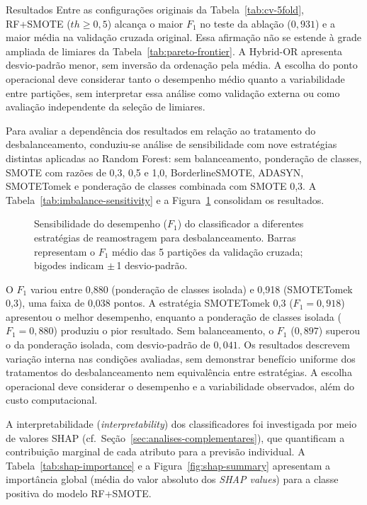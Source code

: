 \begin{chapter}{Resultados}
Entre as configurações originais da Tabela~\ref{tab:cv-5fold}, RF+SMOTE ($th \geq 0{,}5$) alcança o maior $F_1$ no teste da ablação ($0{,}931$) e a maior média na validação cruzada original. Essa afirmação não se estende à grade ampliada de limiares da Tabela~\ref{tab:pareto-frontier}. A Hybrid-OR apresenta desvio-padrão menor, sem inversão da ordenação pela média. A escolha do ponto operacional deve considerar tanto o desempenho médio quanto a variabilidade entre partições, sem interpretar essa análise como validação externa ou como avaliação independente da seleção de limiares.

Para avaliar a dependência dos resultados em relação ao tratamento do desbalanceamento, conduziu-se análise de sensibilidade com nove estratégias distintas aplicadas ao Random Forest: sem balanceamento, ponderação de classes, SMOTE com razões de 0,3, 0,5 e 1,0, BorderlineSMOTE, ADASYN, SMOTETomek e ponderação de classes combinada com SMOTE 0,3. A Tabela~\ref{tab:imbalance-sensitivity} e a Figura~\ref{fig:imbalance-sensitivity} consolidam os resultados.



\begin{figure}[!ht]
\centering
\resizebox{0.92\textwidth}{!}{}
\caption{Sensibilidade do desempenho ($F_1$) do classificador a diferentes estratégias de reamostragem para desbalanceamento. Barras representam o $F_1$ médio das 5 partições da validação cruzada; bigodes indicam $\pm$\,1 desvio-padrão.}
\label{fig:imbalance-sensitivity}
\end{figure}

O $F_1$ variou entre 0,880 (ponderação de classes isolada) e 0,918 (SMOTETomek 0,3), uma faixa de 0,038 pontos. A estratégia SMOTETomek 0,3 ($F_1 = 0{,}918$) apresentou o melhor desempenho, enquanto a ponderação de classes isolada ($F_1 = 0{,}880$) produziu o pior resultado. Sem balanceamento, o $F_1$ ($0{,}897$) superou o da ponderação isolada, com desvio-padrão de $0{,}041$. Os resultados descrevem variação interna nas condições avaliadas, sem demonstrar benefício uniforme dos tratamentos do desbalanceamento nem equivalência entre estratégias. A escolha operacional deve considerar o desempenho e a variabilidade observados, além do custo computacional.

A interpretabilidade (\textit{interpretability}) dos classificadores foi investigada por meio de valores SHAP (cf.\ Seção~\ref{sec:analises-complementares}), que quantificam a contribuição marginal de cada atributo para a previsão individual. A Tabela~\ref{tab:shap-importance} e a Figura~\ref{fig:shap-summary} apresentam a importância global (média do valor absoluto dos \textit{SHAP values}) para a classe positiva do modelo RF+SMOTE.


\end{chapter}
